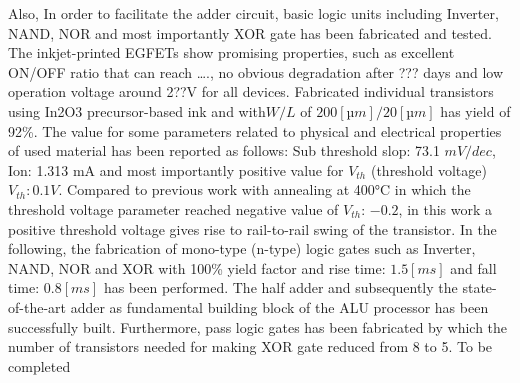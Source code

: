 Also, In order to facilitate the adder circuit, basic logic units including Inverter, NAND, NOR and most importantly XOR gate has been fabricated and tested.  
The inkjet-printed EGFETs show promising properties, such as excellent ON/OFF ratio that can reach …., no obvious degradation after ??? days and low operation voltage around 2??V for all devices.
Fabricated individual transistors using In2O3 precursor-based ink and with$ W/L$ of $200 [µm]/20 [µm]$ has yield of 92\%. The value for some parameters related to physical and electrical properties of used material has been reported as follows: Sub threshold slop: 73.1 $mV/dec$, Ion: 1.313 mA and most importantly positive value for $V_{th}$ (threshold voltage) $V_{th}: 0.1V$. Compared to previous work with annealing at 400°C in which the threshold voltage parameter reached negative value of $V_{th}$: $-0.2$, in this work a positive threshold voltage gives rise to rail-to-rail swing of the transistor.  In the following, the fabrication of mono-type (n-type) logic gates such as Inverter, NAND, NOR and XOR with 100\% yield factor and rise time: $1.5 [ms]$ and fall time: $0.8 [ms]$ has been performed. The half adder and subsequently the state-of-the-art adder as fundamental building block of the ALU processor has been successfully built. Furthermore, pass logic gates has been fabricated by which the number of transistors needed for making XOR gate reduced from 8 to 5. 
To be completed                      
